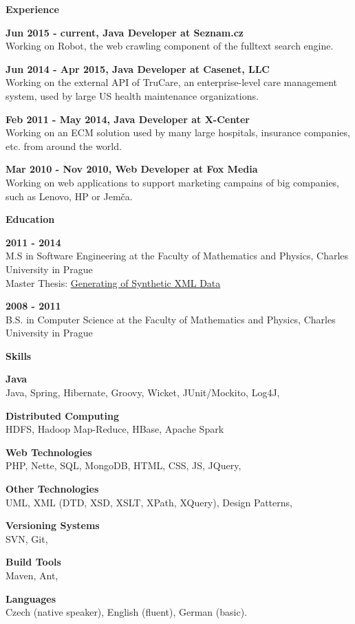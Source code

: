 \documentclass[a4paper,11pt,final]{memoir}
\newcommand{\Sep}{\vspace{1.5em}}
\newcommand{\SmallSep}{\vspace{0.5em}}
\newcommand{\CVSection}[1]
	{\Large\textbf{#1}\par
	\SmallSep\normalsize\normalfont}
\newcommand{\CVItem}[1]
	{\textbf{\color{RoyalBlue} #1}}
\begin{document}
\CVSection{Experience}

\CVItem{Jun 2015 - current, Java Developer at Seznam.cz}\\
Working on Robot, the web crawling component of the fulltext search engine.
\SmallSep

\CVItem{Jun 2014 - Apr 2015, Java Developer at Casenet, LLC}\\
Working on the external API of TruCare, an enterprise-level care management system, used by large US health maintenance organizations.
\SmallSep

\CVItem{Feb 2011 - May 2014, Java Developer at X-Center}\\
Working on an ECM solution used by many large hospitals, insurance companies, etc. from around the world.
\SmallSep

\CVItem{Mar 2010 - Nov 2010, Web Developer at Fox Media}\\
Working on web applications to support marketing campains of big companies, such as Lenovo, HP or Jemča.
\Sep

\CVSection{Education}
\CVItem{2011 - 2014}\\
M.S in Software Engineering at the Faculty of Mathematics and Physics, Charles University in Prague\\
\SmallSep
Master Thesis: \href{http://www.dusanrychnovsky.cz/files/master-thesis.pdf}{Generating of Synthetic XML Data}
\SmallSep

\CVItem{2008 - 2011}\\
B.S. in Computer Science at the Faculty of Mathematics and Physics, Charles University in Prague
\Sep

\CVSection{Skills}

\CVItem{Java}\\
Java, Spring, Hibernate, Groovy, Wicket, JUnit/Mockito, Log4J,
\SmallSep

\CVItem{Distributed Computing}\\
HDFS, Hadoop Map-Reduce, HBase, Apache Spark
\SmallSep

\CVItem{Web Technologies}\\
PHP, Nette, SQL, MongoDB, HTML, CSS, JS, JQuery,
\SmallSep

\CVItem{Other Technologies}\\
UML, XML (DTD, XSD, XSLT, XPath, XQuery), Design Patterns,
\SmallSep 

\CVItem{Versioning Systems}\\
SVN, Git,
\SmallSep 

\CVItem{Build Tools}\\
Maven, Ant,
\SmallSep 

\CVItem{Languages}\\
Czech (native speaker), English (fluent), German (basic).
\Sep 

\end{document}
